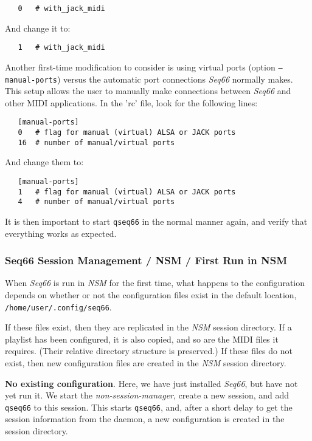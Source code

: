 \begin{verbatim}
   0   # with_jack_midi
\end{verbatim}

   And change it to:

\begin{verbatim}
   1   # with_jack_midi
\end{verbatim}

   Another first-time modification to consider is using virtual ports (option
   \texttt{--manual-ports}) versus the automatic port connections
   \textsl{Seq66} normally makes.
   This setup allows the user to manually make connections between
   \textsl{Seq66} and other MIDI applications.
   In the 'rc' file, look for the following lines:

\begin{verbatim}
   [manual-ports]
   0   # flag for manual (virtual) ALSA or JACK ports
   16  # number of manual/virtual ports
\end{verbatim}

   And change them to:

\begin{verbatim}
   [manual-ports]
   1   # flag for manual (virtual) ALSA or JACK ports
   4   # number of manual/virtual ports
\end{verbatim}

   It is then important to start \texttt{qseq66} in the normal manner again,
   and verify that everything works as expected.

\subsubsection{Seq66 Session Management / NSM / First Run in NSM}
\label{subsec:sessions_nsm_first_run_in_nsm}

   When \textsl{Seq66} is run in \textsl{NSM} for the first time,
   what happens to the configuration depends on whether or not 
   the configuration files exist in the default location,
   \texttt{/home/user/.config/seq66}.

   If these files exist, then they are replicated in the \textsl{NSM} session
   directory.  If a playlist has been configured, it is also copied, and so are
   the MIDI files it requires. (Their relative directory structure is
   preserved.)
   If these files do not exist, then new configuration files are created
   in the \textsl{NSM} session directory.

   \textbf{No existing configuration}.
   Here, we have just installed \textsl{Seq66}, but have not yet run it.
   We start the \textsl{non-session-manager}, create a new session, and
   add \texttt{qseq66} to this session.  This starts \texttt{qseq66}, and,
   after a short delay to get the session information from the daemon, a new
   configuration is created in the session directory.

